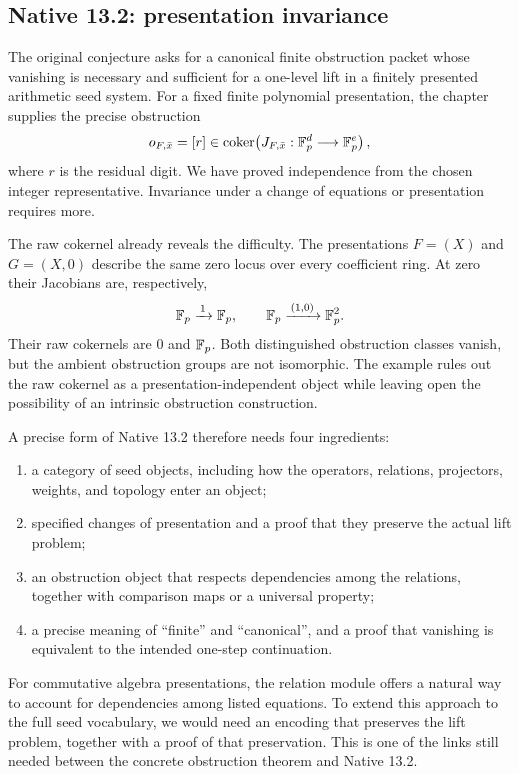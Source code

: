 \subsection{Native 13.2: presentation invariance}
\label{subsec:native132}

The original conjecture asks for a canonical finite obstruction packet whose
vanishing is necessary and sufficient for a one-level lift in a finitely
presented arithmetic seed system. For a fixed finite polynomial presentation,
the chapter supplies the precise obstruction
\[
o_{F,\bar x}=[r]\in
\operatorname{coker}\!\left(J_{F,\bar x}:\mathbb F_p^d\longrightarrow\mathbb F_p^e\right),
\]
where $r$ is the residual digit. We have proved independence from the chosen
integer representative. Invariance under a change of equations or presentation
requires more.

The raw cokernel already reveals the difficulty.
The presentations $F=(X)$ and $G=(X,0)$ describe the same zero locus over every
coefficient ring. At zero their Jacobians are, respectively,
\[
\mathbb F_p\xrightarrow{\,1\,}\mathbb F_p,
\qquad
\mathbb F_p\xrightarrow{\,(1,0)\,}\mathbb F_p^2.
\]
Their raw cokernels are $0$ and $\mathbb F_p$. Both distinguished obstruction classes
vanish, but the ambient obstruction groups are not isomorphic. The example
rules out the raw cokernel as a presentation-independent object while leaving
open the possibility of an intrinsic obstruction construction.

A precise form of Native 13.2 therefore needs four ingredients:
\begin{enumerate}
\item a category of seed objects, including how the operators, relations,
projectors, weights, and topology enter an object;
\item specified changes of presentation and a proof that they preserve the
actual lift problem;
\item an obstruction object that respects dependencies among the relations,
together with comparison maps or a universal property;
\item a precise meaning of ``finite'' and ``canonical'', and a proof that
vanishing is equivalent to the intended one-step continuation.
\end{enumerate}
For commutative algebra presentations, the relation module offers a natural
way to account for dependencies among listed equations. To extend this
approach to the full seed vocabulary, we would need an encoding that preserves
the lift problem, together with a proof of that preservation. This is one of
the links still needed between the concrete obstruction theorem and Native 13.2.

